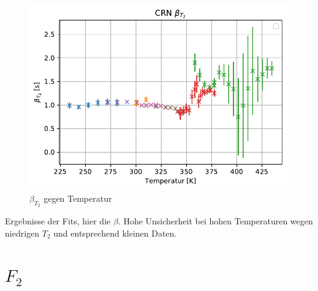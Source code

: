 \begin{figure}
	\begin{center}
		\includegraphics[width=\textwidth]{graphics/plots/T2/t2_beta.pdf}
	\end{center}
	\caption{$\beta_{T_2}$ gegen Temperatur} \label{fig:res:beta_T_2}
\end{figure}
Ergebnisse der Fits, hier die $\beta$. Hohe Unsicherheit bei hohen Temperaturen wegen niedrigen $T_2$ und entsprechend kleinen Daten.




\section{$F_2$} \label{section:res:F_2}

